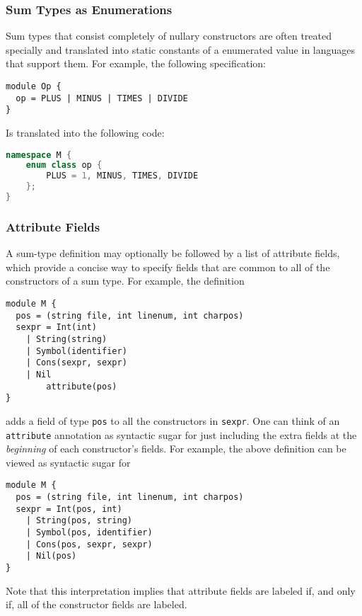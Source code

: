 \subsubsection{Sum Types as Enumerations}
\label{sec:enumerations}

Sum types that consist completely of nullary constructors
are often treated specially and translated into static constants of a
enumerated value in languages that support them.
For example, the following \asdl{} specification:
%
\begin{code}\begin{lstlisting}[language=ASDL]
module Op {
  op = PLUS | MINUS | TIMES | DIVIDE 
}
\end{lstlisting}\end{code}%
%
Is translated into the following \Cplusplus{} code:
%
\begin{code}\begin{lstlisting}[language=c++]
namespace M {
    enum class op {
        PLUS = 1, MINUS, TIMES, DIVIDE
    };
}
\end{lstlisting}\end{code}%

\subsubsection{Attribute Fields}
A sum-type definition may optionally be followed by a list of attribute fields, which
provide a concise way to specify fields that are common to all of the constructors
of a sum type.
For example, the definition
%
\begin{code}\begin{lstlisting}[language=ASDL]
module M {
  pos = (string file, int linenum, int charpos)
  sexpr = Int(int)
	| String(string)
	| Symbol(identifier)
	| Cons(sexpr, sexpr)
	| Nil
        attribute(pos)
}
\end{lstlisting}\end{code}%
adds a field of type \lstinline[language=ASDL]!pos! to all the constructors
in \lstinline[language=ASDL]!sexpr!.
One can think of an \lstinline!attribute! annotation as syntactic sugar for just including
the extra fields at the \emph{beginning} of each constructor's fields.
For example, the above definition can be viewed as syntactic sugar for
%
\begin{code}\begin{lstlisting}[language=ASDL]
module M {
  pos = (string file, int linenum, int charpos)
  sexpr = Int(pos, int)
	| String(pos, string)
	| Symbol(pos, identifier)
	| Cons(pos, sexpr, sexpr)
	| Nil(pos)
}
\end{lstlisting}\end{code}%
Note that this interpretation implies that attribute fields are labeled if, and only if, all
of the constructor fields are labeled.


